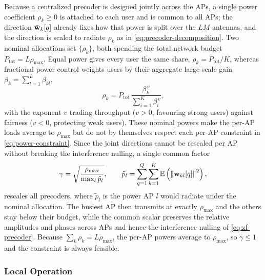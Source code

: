 Because a centralized precoder is designed jointly across the APs, a single power
coefficient $\rho_{k}\geq 0$ is attached to each user and is common to all APs;
the direction $\bar{\boldsymbol{\mathrm{w}}}_{k}[q]$ already fixes how that power is split over
the $LM$ antennas, and the direction is scaled to radiate $\rho_{k}$ as in
\eqref{eq:precoder-decomposition}. Two nominal allocations set $\{\rho_{k}\}$,
both spending the total network budget $P_{\mathrm{tot}}=L\rho_{\max}$. Equal
power gives every user the same share, $\rho_{k}=P_{\mathrm{tot}}/K$, whereas
fractional power control weights users by their aggregate large-scale gain
$\beta_{k}=\sum_{l=1}^{L}\beta_{kl}$,
\begin{equation}
\label{eq:centralized-fractional}
\rho_{k} = P_{\mathrm{tot}}\,
\frac{\beta_{k}^{\,v}}{\sum_{i=1}^{K}\beta_{i}^{\,v}},
\end{equation}
with the exponent $v$ trading throughput ($v>0$, favouring strong
users) against fairness ($v<0$, protecting weak users). These nominal powers
make the per-AP loads average to $\rho_{\max}$ but do not by themselves respect
each per-AP constraint in \eqref{eq:power-constraint}. Since the joint directions
cannot be rescaled per AP without breaking the interference nulling, a single
common factor
\begin{equation}
\label{eq:power-normalization}
\gamma = \sqrt{\frac{\rho_{\max}}{\max_{l}\tilde{p}_{l}}},
\qquad
\tilde{p}_{l} = \sum_{q=1}^{Q}\sum_{k=1}^{K}
\mathbb{E}\left(\left\lVert\boldsymbol{\mathrm{w}}_{kl}[q]\right\rVert^{2}\right),
\end{equation}
rescales all precoders, where $\tilde{p}_{l}$ is the power AP $l$ would radiate
under the nominal allocation. The busiest AP then transmits at exactly
$\rho_{\max}$ and the others stay below their budget, while the common scalar
preserves the relative amplitudes and phases across APs and hence the
interference nulling of \eqref{eq:zf-precoder}. Because $\sum_{k}\rho_{k}=L\rho_{\max}$,
the per-AP powers average to $\rho_{\max}$, so $\gamma\leq 1$ and the constraint
is always feasible.

\subsubsection{Local Operation}
\label{sssec:local}

